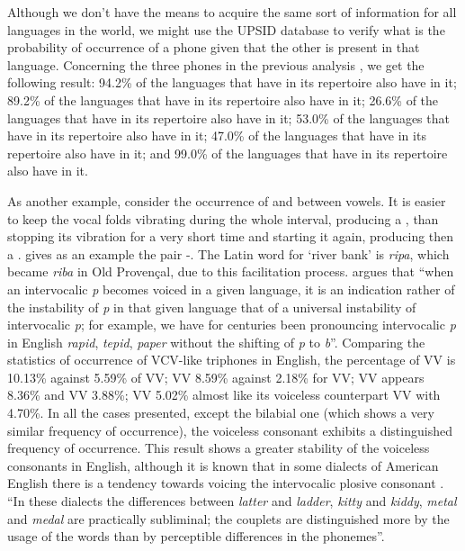 Although we don't have the means to acquire the same sort of information for all languages in the world, we might use the UPSID database \citep{maddieson1884} to verify what is the probability of occurrence of a phone given that the other is present in that language. Concerning the three phones in the previous analysis \textipa{[m,n,d]}, we get the following result: 94.2\% of the languages that have \textipa{[d]} in its repertoire also have \textipa{[m]} in it; 89.2\% of the languages that have \textipa{[d]} in its repertoire also have \textipa{[n]} in it; 26.6\% of the languages that have \textipa{[m]} in its repertoire also have \textipa{[d]} in it; 53.0\% of the languages that have \textipa{[n]} in its repertoire also have \textipa{[d]} in it; 47.0\% of the languages that have \textipa{[m]} in its repertoire also have \textipa{[n]} in it; and 99.0\% of the languages that have \textipa{[n]} in its repertoire also have \textipa{[m]} in it.

As another example, consider the occurrence of \textipa{[t]} and \textipa{[d]} between vowels. It is easier to keep the vocal folds vibrating during the whole interval, producing a \textipa{[d]}, than stopping its vibration for a very short time and starting it again, producing then a \textipa{[t]}. \cite{zipf1949} gives as an example the pair \textipa{[p]}-\textipa{[b]}. The Latin word for `river bank' is \textit{ripa}, which became \textit{riba} in Old Provençal, due to this facilitation process. \cite{zipf1949} argues that ``when an intervocalic \textit{p} becomes voiced in a given language, it is an indication rather of the instability of \textit{p} in that given language that of a universal instability of intervocalic \textit{p}; for example, we have for centuries been pronouncing intervocalic \textit{p} in English \textit{rapid}, \textit{tepid}, \textit{paper} without the shifting of \textit{p} to \textit{b}''. Comparing the statistics of occurrence of VCV-like triphones in English, the percentage of VV is 10.13\% against 5.59\% of VV; VV 8.59\% against 2.18\% for VV; VV appears 8.36\% and VV 3.88\%; VV 5.02\% almost like its voiceless counterpart VV with 4.70\%. In all the cases presented, except the bilabial one (which shows a very similar frequency of occurrence), the voiceless consonant exhibits a distinguished frequency of occurrence. This result shows a greater stability of the voiceless consonants in English, although it is known that in some dialects of American English there is a tendency towards voicing the intervocalic plosive consonant \textipa{[t]}. ``In these dialects the differences between \textit{latter} and \textit{ladder}, \textit{kitty} and \textit{kiddy}, \textit{metal} and \textit{medal} are practically subliminal; the couplets are distinguished more by the usage of the words than by perceptible differences in the phonemes''\citep{zipf1949}.

